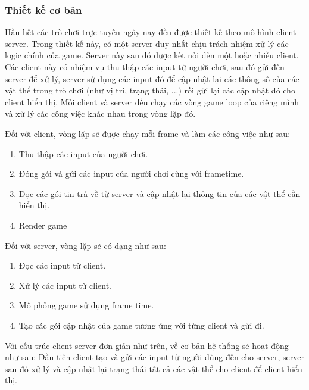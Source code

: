 \documentclass[12pt,a4paper]{article}
\begin{document}
  \subsubsection{Thiết kế cơ bản}
  Hầu hết các trò chơi trực tuyến ngày nay đều được thiết kế theo mô hình client-server. Trong thiết kế này, có một server duy nhất chịu trách nhiệm xử lý các logic chính của game. Server này sau đó được kết nối đến một hoặc nhiều client. Các client này có nhiệm vụ thu thập các input từ người chơi, sau đó gửi đến server để xử lý, server sử dụng các input đó để cập nhật lại các thông số của các vật thể trong trò chơi (như vị trí, trạng thái, ...) rồi gửi lại các cập nhật đó cho client hiển thị.
  Mỗi client và server đều chạy các vòng game loop của riêng mình và xử lý các công việc khác nhau trong vòng lặp đó.
  
  Đối với client, vòng lặp sẽ được chạy mỗi frame và làm các công việc như sau:
  \begin{enumerate}
      \item Thu thập các input của người chơi.
      \item Đóng gói và gửi các input của người chơi cùng với frametime.
      \item Đọc các gói tin trả về từ server và cập nhật lại thông tin của các vật thể cần hiển thị.
      \item Render game
  \end{enumerate}
  
  Đối với server, vòng lặp sẽ có dạng như sau:
  \begin{enumerate}
      \item Đọc các input từ client.
      \item Xử lý các input từ client.
      \item Mô phỏng game sử dụng frame time.
      \item Tạo các gói cập nhật của game tương ứng với từng client và gửi đi.
  \end{enumerate}
  
  Với cấu trúc client-server đơn giản như trên, về cơ bản hệ thống sẽ hoạt động như sau: Đầu tiên client tạo và gửi các input từ người dùng đến cho server, server sau đó xử lý và cập nhật lại trạng thái tất cả các vật thể cho client để client hiển thị.
\end{document}
